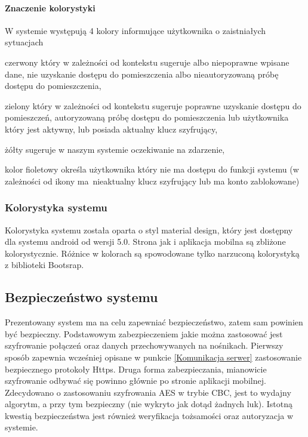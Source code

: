 \documentclass[twoside,10pt]{article}
\begin{document}
\paragraph*{Znaczenie kolorystyki}
W systemie występują 4 kolory informujące użytkownika o zaistniałych sytuacjach
\begin{itemize*}
\item czerwony który w zależności od kontekstu sugeruje albo niepoprawne wpisane dane, nie uzyskanie dostępu do pomieszczenia albo nieautoryzowaną próbę dostępu do pomieszczenia,
\item zielony który w zależności od kontekstu sugeruje poprawne uzyskanie dostępu do pomieszczeń, autoryzowaną próbę dostępu do pomieszczenia lub użytkownika który jest aktywny, lub posiada aktualny klucz szyfrujący,
\item żółty sugeruje w naszym systemie oczekiwanie na zdarzenie,
\item kolor fioletowy określa użytkownika który nie ma dostępu do funkcji systemu (w zależności od ikony ma~nieaktualny klucz szyfrujący lub ma konto zablokowane)
\end{itemize*}

\subsubsection{Kolorystyka systemu}
Kolorystyka systemu została oparta o styl material design, który jest dostępny dla systemu android od wersji 5.0. Strona jak i aplikacja mobilna są zbliżone kolorystycznie. Różnice w kolorach są spowodowane tylko narzuconą kolorystyką z biblioteki Bootsrap\cite{And,desingMobile}.

\subsection{Bezpieczeństwo systemu}\label{sec:Projekt bezpieczeństwo}
Prezentowany system ma na celu zapewniać bezpieczeństwo, zatem sam powinien być bezpieczny. Podstawowym zabezpieczeniem jakie można zastosować jest szyfrowanie połączeń oraz danych przechowywanych na nośnikach. Pierwszy sposób zapewnia wcześniej opisane w punkcie \ref{Komunikacja serwer} zastosowanie bezpiecznego protokoły Https. Druga forma zabezpieczania, mianowicie szyfrowanie odbywać się powinno głównie po stronie aplikacji mobilnej. Zdecydowano o zastosowaniu szyfrowania AES w trybie CBC, jest to wydajny algorytm, a przy tym bezpieczny (nie wykryto jak dotąd żadnych luk). Istotną kwestią bezpieczeństwa jest również weryfikacja tożsamości oraz autoryzacja w systemie.
\end{document}
